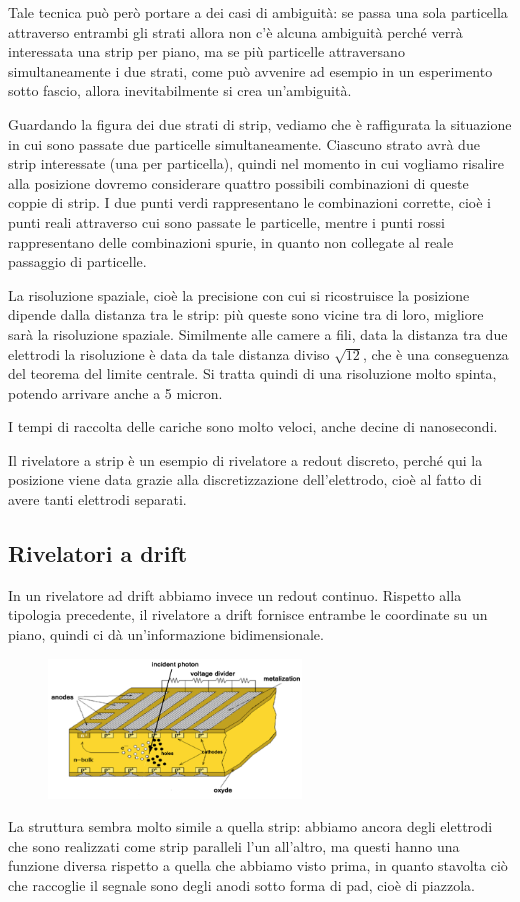 Tale tecnica può però portare a dei casi di ambiguità: se passa una sola particella attraverso entrambi gli strati allora non c'è alcuna ambiguità perché verrà interessata una strip per piano, ma se più particelle attraversano simultaneamente i due strati, come può avvenire ad esempio in un esperimento sotto fascio, allora inevitabilmente si crea un'ambiguità.

Guardando la figura dei due strati di strip, vediamo che è raffigurata la situazione in cui sono passate due particelle simultaneamente. Ciascuno strato avrà due strip interessate (una per particella), quindi nel momento in cui vogliamo risalire alla posizione dovremo considerare quattro possibili combinazioni di queste coppie di strip. I due punti verdi rappresentano le combinazioni corrette, cioè i punti reali attraverso cui sono passate le particelle, mentre i punti rossi rappresentano delle combinazioni spurie, in quanto non collegate al reale passaggio di particelle. 

La risoluzione spaziale, cioè la precisione con cui si ricostruisce la posizione dipende dalla distanza tra le strip: più queste sono vicine tra di loro, migliore sarà la risoluzione spaziale. Similmente alle camere a fili, data la distanza tra due elettrodi la risoluzione è data da tale distanza diviso $\sqrt{12}$, che è una conseguenza del teorema del limite centrale. Si tratta quindi di una risoluzione molto spinta, potendo arrivare anche a 5 micron.

I tempi di raccolta delle cariche sono molto veloci, anche decine di nanosecondi.

Il rivelatore a strip è un esempio di rivelatore a redout discreto, perché qui la posizione viene data grazie alla discretizzazione dell'elettrodo, cioè al fatto di avere tanti elettrodi separati.

\subsection{Rivelatori a drift}

In un rivelatore ad drift abbiamo invece un redout continuo. Rispetto alla tipologia precedente, il rivelatore a drift fornisce entrambe le coordinate su un piano, quindi ci dà un'informazione bidimensionale.
\begin{figure}[H]
   \centering
   \includegraphics[width=0.6\textwidth]{immagini/rivelatori_a_drift.png}
\end{figure}
La struttura sembra molto simile a quella strip: abbiamo ancora degli elettrodi che sono realizzati come strip paralleli l'un all'altro, ma questi hanno una funzione diversa rispetto a quella che abbiamo visto prima, in quanto stavolta ciò che raccoglie il segnale sono degli anodi sotto forma di pad, cioè di piazzola.

